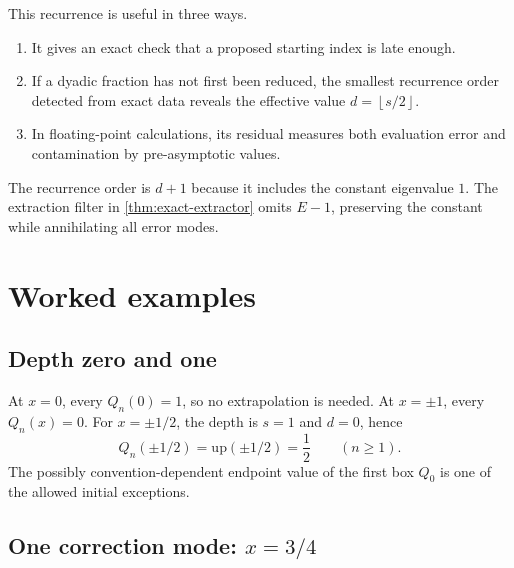 \documentclass[11pt,oneside]{article}
\numberwithin{equation}{section}
\theoremstyle{definition}
\theoremstyle{remark}
\newcommand{\upf}{\mathrm{up}}
\newcommand{\floor}[1]{\left\lfloor #1\right\rfloor}
\begin{document}
This recurrence is useful in three ways.

\begin{enumerate}
\item It gives an exact check that a proposed starting index is late enough.
\item If a dyadic fraction has not first been reduced, the smallest recurrence
order detected from exact data reveals the effective value $d=\floor{s/2}$.
\item In floating-point calculations, its residual measures both evaluation
error and contamination by pre-asymptotic values.
\end{enumerate}

The recurrence order is $d+1$ because it includes the constant eigenvalue $1$.
The extraction filter in \cref{thm:exact-extractor} omits $E-1$, preserving the
constant while annihilating all error modes.

\section{Worked examples}

\subsection{Depth zero and one}

At $x=0$, every $Q_n(0)=1$, so no extrapolation is needed.  At $x=\pm1$, every
$Q_n(x)=0$.  For $x=\pm1/2$, the depth is $s=1$ and $d=0$, hence
\begin{equation}
 Q_n(\pm1/2)=\upf(\pm1/2)=\frac12\qquad(n\ge1).
 \label{eq:half-example}
\end{equation}
The possibly convention-dependent endpoint value of the first box $Q_0$ is one
of the allowed initial exceptions.

\subsection{One correction mode: \texorpdfstring{$x=3/4$}{x = 3/4}}
\end{document}
